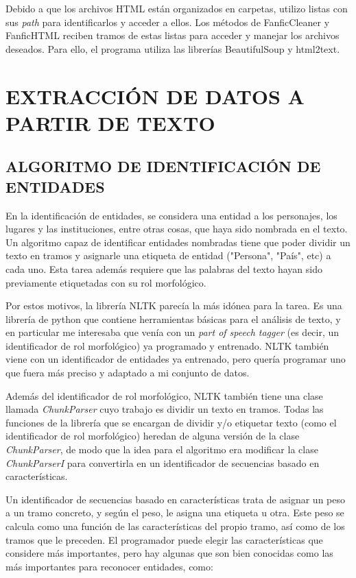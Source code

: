 \documentclass{pre-tfg}
\begin{document}
Debido a que los archivos HTML están organizados en carpetas, utilizo listas con sus \textit{path} para identificarlos y acceder a ellos. Los métodos de FanficCleaner y FanficHTML reciben tramos de estas listas para acceder y manejar los archivos deseados.
Para ello, el programa utiliza las librerías BeautifulSoup y html2text.

\section {EXTRACCIÓN DE DATOS A PARTIR DE TEXTO}

\subsection{ALGORITMO DE IDENTIFICACIÓN DE ENTIDADES}

En la identificación de entidades, se considera una entidad a los personajes, los lugares y las instituciones, entre otras cosas, que haya sido nombrada en el texto. Un algoritmo capaz de identificar entidades nombradas tiene que poder dividir un texto en tramos y asignarle una etiqueta de entidad ("Persona", "País", etc) a cada uno. Esta tarea además requiere que las palabras del texto hayan sido previamente etiquetadas con su rol morfológico.

Por estos motivos, la librería NLTK parecía la más idónea para la tarea. Es una librería de python que contiene herramientas básicas para el análisis de texto, y en particular me interesaba que venía con un \textit{part of speech tagger} (es decir, un identificador de rol morfológico) ya programado y entrenado. NLTK también viene con un identificador de entidades ya entrenado, pero quería programar uno que fuera más preciso y adaptado a mi conjunto de datos.

Además del identificador de rol morfológico, NLTK también tiene una clase llamada \textit{ChunkParser} cuyo trabajo es dividir un texto en tramos. Todas las funciones de la librería que se encargan de dividir y/o etiquetar texto (como el identificador de rol morfológico) heredan de alguna versión de la clase \textit{ChunkParser}, de modo que la idea para el algoritmo era modificar la clase \textit{ChunkParserI} para convertirla en un identificador de secuencias basado en características.

Un identificador de secuencias basado en características trata de asignar un peso a un tramo concreto, y según el peso, le asigna una etiqueta u otra. Este peso se calcula como una función de las características del propio tramo, así como de los tramos que le preceden.
El programador puede elegir las características que considere más importantes, pero hay algunas que son bien conocidas como las más importantes para reconocer entidades, como:
\end{document}
